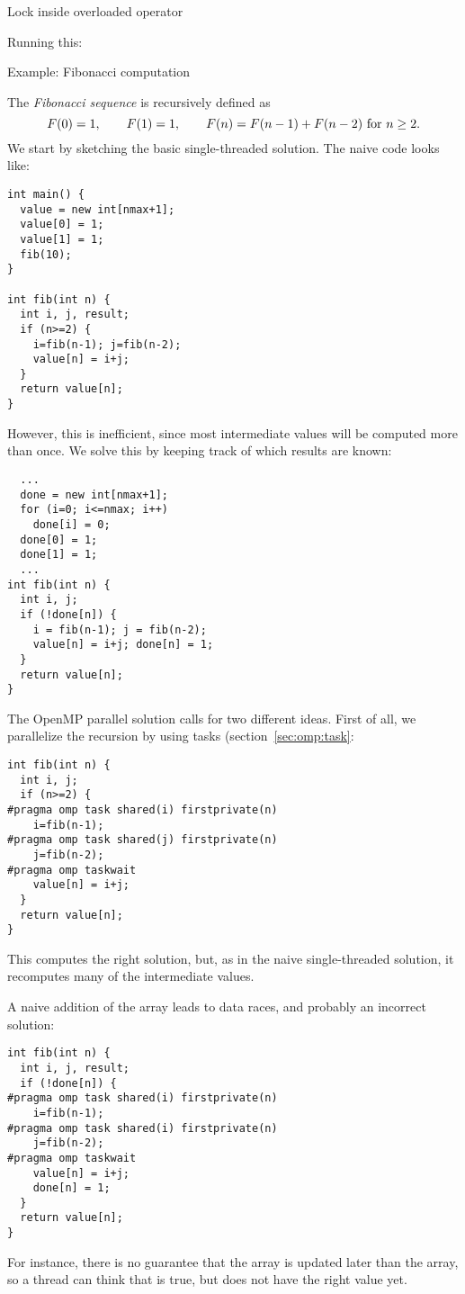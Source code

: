 \begin{cppnote}{Lock inside overloaded operator}
  \label{cpp:op-lock}

  Running this:

\end{cppnote}


 {Example: Fibonacci computation}

The \emph{Fibonacci sequence} is recursively defined as
\[ F(0)=1,\qquad F(1)=1,\qquad F(n)=F(n-1)+F(n-2)
\hbox{ for $n\geq2$}.
\]
We start by sketching the basic single-threaded solution.
The naive code looks like:
\begin{lstlisting}
int main() {
  value = new int[nmax+1];
  value[0] = 1;
  value[1] = 1;
  fib(10);
}

int fib(int n) {
  int i, j, result;
  if (n>=2) {
    i=fib(n-1); j=fib(n-2);
    value[n] = i+j;
  }
  return value[n];
}
\end{lstlisting}
However, this is inefficient, since most intermediate values will be computed
more than once. We solve this by keeping track of which results are known:
\begin{lstlisting}
  ...
  done = new int[nmax+1];
  for (i=0; i<=nmax; i++)
    done[i] = 0;
  done[0] = 1;
  done[1] = 1;
  ...
int fib(int n) {
  int i, j;
  if (!done[n]) {
    i = fib(n-1); j = fib(n-2);
    value[n] = i+j; done[n] = 1;
  }
  return value[n];
}
\end{lstlisting}
The OpenMP parallel solution calls for two different ideas. First of all,
we parallelize the recursion by using tasks (section~\ref{sec:omp:task}:
\begin{lstlisting}
int fib(int n) {
  int i, j;
  if (n>=2) {
#pragma omp task shared(i) firstprivate(n)
    i=fib(n-1);
#pragma omp task shared(j) firstprivate(n)
    j=fib(n-2);
#pragma omp taskwait
    value[n] = i+j;
  }
  return value[n];
}
\end{lstlisting}
This computes the right solution, but, as in the naive single-threaded solution,
it recomputes many of the intermediate values.

A naive addition of the  array leads to data races, and probably an
incorrect solution:
\begin{lstlisting}
int fib(int n) {
  int i, j, result;
  if (!done[n]) {
#pragma omp task shared(i) firstprivate(n)
    i=fib(n-1);
#pragma omp task shared(i) firstprivate(n)
    j=fib(n-2);
#pragma omp taskwait
    value[n] = i+j;
    done[n] = 1;
  }
  return value[n];
}
\end{lstlisting}
For instance, there is no guarantee that the  array is updated
later than the  array, so a thread can think that 
is true, but  does not have the right value yet.

